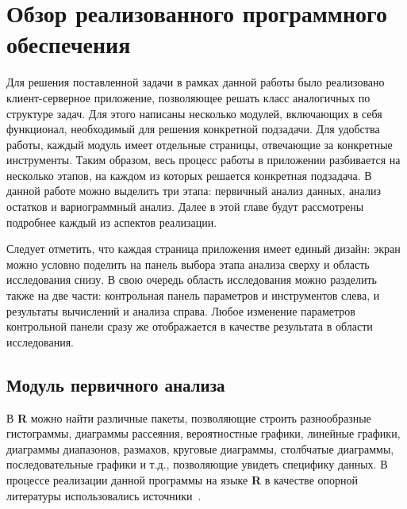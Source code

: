 
\newpage

\chapter{Обзор реализованного программного обеспечения}

Для решения поставленной задачи в рамках данной работы было реализовано клиент-серверное приложение, позволяющее решать класс аналогичных по структуре задач. Для этого написаны несколько модулей, включающих в себя функционал, необходимый для решения конкретной подзадачи. Для удобства работы, каждый модуль имеет отдельные страницы, отвечающие за конкретные инструменты. Таким образом, весь процесс работы в приложении разбивается на несколько этапов, на каждом из которых решается конкретная подзадача. В данной работе можно выделить три этапа: первичный анализ данных, анализ остатков и вариограммный анализ. Далее в этой главе будут рассмотрены подробнее каждый из аспектов реализации.

Следует отметить, что каждая страница приложения имеет единый дизайн: экран можно условно поделить на панель выбора этапа анализа сверху и область исследования снизу. В свою очередь область исследования можно разделить также на две части: контрольная панель параметров и инструментов слева, и результаты вычислений и анализа справа. Любое изменение параметров контрольной панели сразу же отображается в качестве результата в области исследования.

\section{Модуль первичного анализа} %
\label{sec:mod_basis}

В \textbf{R} можно найти различные пакеты, позволяющие строить разнообразные гистограммы, диаграммы рассеяния, вероятностные графики, линейные графики, диаграммы диапазонов, размахов, круговые диаграммы, столбчатые диаграммы, последовательные графики и т.д., позволяющие увидеть специфику данных. В процессе реализации данной программы на языке \textbf{R} в качестве опорной литературы использовались источники~\cite{Kabacoff2009R, Teetor2011RCook, Chang2012RGraph}.

